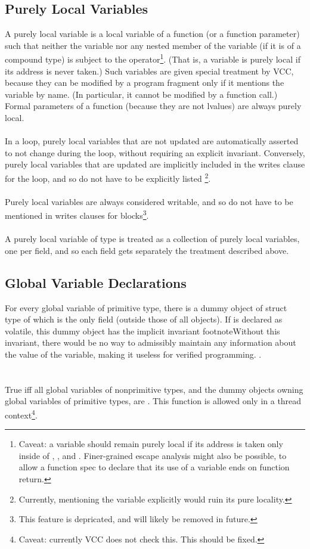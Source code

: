 \documentclass[preprint,nocopyrightspace]{sigplanconf}
\begin{document}
{{{\subsection{Purely Local Variables}
A purely local variable is a local variable of a function (or a
function parameter) such that neither the variable nor any nested
member of the variable (if it is of a compound type) is subject to
the \vcc{&} operator\footnote{Caveat:
a variable should remain purely local if its
address is taken only inside of , , and .
Finer-grained escape analysis might also be possible, to allow
a function spec to declare that its use of a variable ends on function return.
}. (That is, a variable is purely local if its
address is never taken.) Such variables are given special treatment
by VCC, because they can be modified by a program fragment only if it
mentions the variable by name. (In particular, it cannot be modified
by a function call.) Formal parameters of a function (because they are not
lvalues) are always purely local. 
\\\\
In a loop, purely local variables that are not updated are
automatically asserted to not change during the loop, without
requiring an explicit invariant. Conversely, purely local variables
that are updated are implicitly included in the writes clause for the
loop, and so do not have to be explicitly listed \footnote{Currently,
mentioning the variable explicitly would ruin its pure locality.
}.
\\\\
Purely local variables are always considered writable, and so do not
have to be mentioned in writes clauses for blocks\footnote{This
feature is depricated, and will likely be removed in future.}. 
\\\\
A purely local variable of  type is treated
as a collection of purely local variables, one per field, and so each
field gets separately the treatment described above.

\subsection{Global Variable Declarations}
For every global variable  of primitive type, there is a dummy object
of struct type of which  is the only field (outside those of
all objects). If  is declared as volatile, this dummy object has the implicit invariant
footnote{Without this invariant, there would be no way to admissibly
maintain any information about the value of the variable, making it
useless for verified programming.
}.
\\\\
\\
True iff all global variables of nonprimitive types, and the dummy
objects owning global variables of primitive types,
are \vcc{\mutable}. This function is allowed only in a thread
context\footnote{
Caveat: currently VCC does not check this. This should be fixed.
}.


}}}
\end{document}
